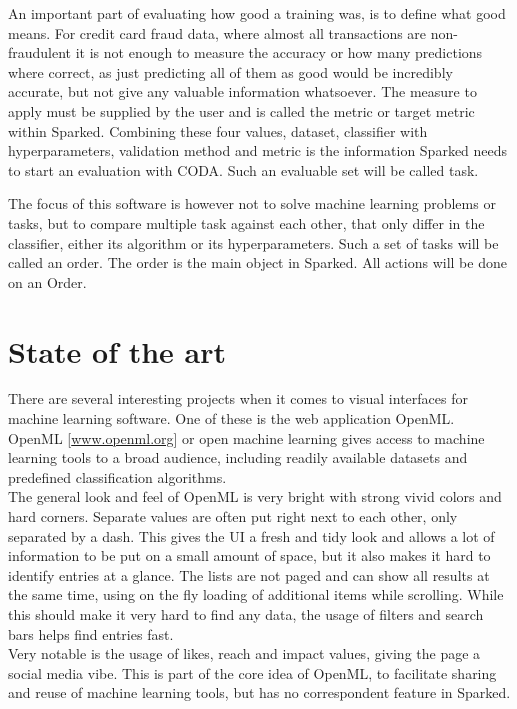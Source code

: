 An important part of evaluating how good a training was, is to define what good means. For credit card fraud data, where almost all transactions are non-fraudulent it is not enough to measure the accuracy or how many predictions where correct, as just predicting all of them as good would be incredibly accurate, but not give any valuable information whatsoever. The measure to apply must be supplied by the user and is called the metric or target metric within Sparked. 
Combining these four values, dataset, classifier with hyperparameters, validation method and metric is the information Sparked needs to start an evaluation with CODA. Such an evaluable set will be called task. 

The focus of this software is however not to solve machine learning problems or tasks, but to compare multiple task against each other, that only differ in the classifier, either its algorithm or its hyperparameters. Such a set of tasks will be called an order. The order is the main object in Sparked. All actions will be done on an Order. 

\section{State of the art}
There are several interesting projects when it comes to visual interfaces for machine learning software. One of these is the web application OpenML. OpenML [\hyperlink{www.openml.org}{www.openml.org}] or open machine learning gives access to machine learning tools to a broad audience, including readily available datasets and predefined classification algorithms.\\
The general look and feel of OpenML is very bright with strong vivid colors and hard corners. Separate values are often put right next to each other, only separated by a dash. This gives the UI a fresh and tidy look and allows a lot of information to be put on a small amount of space, but it also makes it hard to identify entries at a glance. The lists are not paged and can show all results at the same time, using on the fly loading of additional items while scrolling. While this should make it very hard to find any data, the usage of filters and search bars helps find entries fast. \\
Very notable is the usage of likes, reach and impact values, giving the page a social media vibe. This is part of the core idea of OpenML, to facilitate sharing and reuse of machine learning tools, but has no correspondent feature in Sparked. 
 

